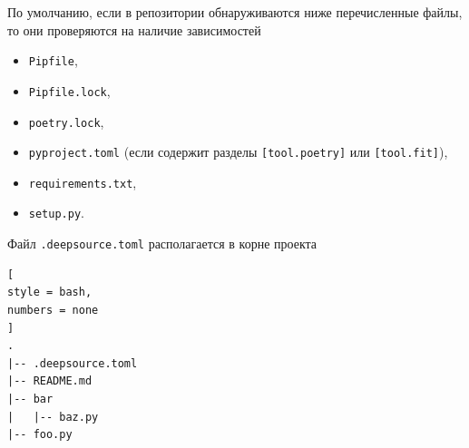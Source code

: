 \documentclass[%
	11pt,
	a4paper,
	utf8,
		]{article}
\begin{document}
По умолчанию, если в репозитории обнаруживаются ниже перечисленные файлы, то они проверяются на наличие зависимостей
\begin{itemize}
	\item \texttt{Pipfile},
	
	\item \texttt{Pipfile.lock},
	
	\item \texttt{poetry.lock},
	
	\item \texttt{pyproject.toml} (если содержит разделы \texttt{[tool.poetry]} или \texttt{[tool.fit]}),
	
	\item \texttt{requirements.txt},
	
	\item \texttt{setup.py}.
\end{itemize}

Файл \texttt{.deepsource.toml} располагается в корне проекта
\begin{lstlisting}[
style = bash,
numbers = none	
]
.
|-- .deepsource.toml
|-- README.md
|-- bar
|   |-- baz.py
|-- foo.py
\end{lstlisting}
\end{document}
